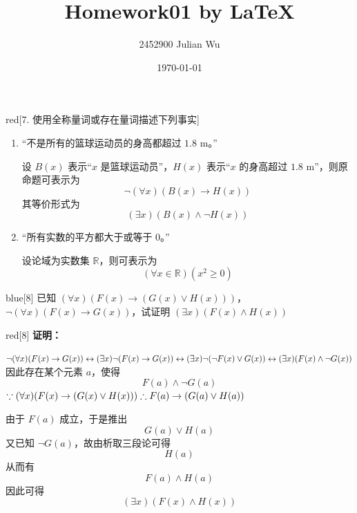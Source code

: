 \documentclass[12pt,onecolumn]{ctexrep}
\title{Homework01 by \LaTeX}
\author{2452900 Julian Wu}
\date{\today}
\begin{document}
\maketitle

\begin{mybox}{red}{}[7. 使用全称量词或存在量词描述下列事实]
    \begin{enumerate}
        \item[(a)] “不是所有的篮球运动员的身高都超过 $1.8\text{ m}$。”

              设 $B(x)$ 表示“$x$ 是篮球运动员”，$H(x)$ 表示“$x$ 的身高超过 $1.8\text{ m}$”，则原命题可表示为
              \[
                  \neg (\forall x)(B(x)\rightarrow H(x))
              \]
              其等价形式为
              \[
                  (\exists x)(B(x)\land \neg H(x))
              \]

        \item[(b)] “所有实数的平方都大于或等于 $0$。”

              设论域为实数集 $\mathbb{R}$，则可表示为
              \[
                  (\forall x\in \mathbb{R})(x^2\ge 0)
              \]
    \end{enumerate}
\end{mybox}

\vspace{1em}
\begin{mybox}{blue}{}[8]
    已知 $(\forall x)(F(x)\rightarrow (G(x)\lor H(x)))$，$\neg (\forall x)(F(x)\rightarrow G(x))$，试证明 $(\exists x)(F(x)\land H(x))$
\end{mybox}

\begin{mybox}{red}{}[8]
    \textbf{证明：}

    $\neg (\forall x)(F(x)\rightarrow G(x))\\
        \leftrightarrow(\exists x)\neg (F(x)\rightarrow G(x))\\
        \leftrightarrow(\exists x)\neg(\neg F(x)\lor G(x))\\
        \leftrightarrow(\exists x)(F(x)\land \neg G(x))$
    因此存在某个元素 $a$，使得
    \[
        F(a)\land \neg G(a)
    \]
    $\because (\forall x)(F(x)\rightarrow (G(x)\lor H(x)))\\
    \therefore F(a)\rightarrow (G(a)\lor H(a))\\$

    由于 $F(a)$ 成立，于是推出
    \[
        G(a)\lor H(a)
    \]
    又已知 $\neg G(a)$，故由析取三段论可得
    \[
        H(a)
    \]
    从而有
    \[
        F(a)\land H(a)
    \]
    因此可得
    \[
        (\exists x)(F(x)\land H(x))
    \]
\end{mybox}
\end{document}
